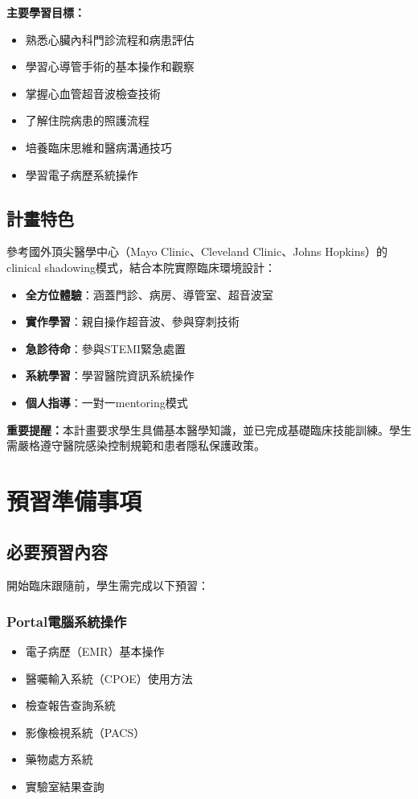 \documentclass[12pt,a4paper]{article}
\begin{document}
\textbf{主要學習目標：}
\begin{itemize}[nosep]
    \item 熟悉心臟內科門診流程和病患評估
    \item 學習心導管手術的基本操作和觀察
    \item 掌握心血管超音波檢查技術
    \item 了解住院病患的照護流程
    \item 培養臨床思維和醫病溝通技巧
    \item 學習電子病歷系統操作
\end{itemize}

\subsection{計畫特色}
參考國外頂尖醫學中心（Mayo Clinic、Cleveland Clinic、Johns Hopkins）的clinical shadowing模式，結合本院實際臨床環境設計：

\begin{itemize}[nosep]
    \item \textbf{全方位體驗}：涵蓋門診、病房、導管室、超音波室
    \item \textbf{實作學習}：親自操作超音波、參與穿刺技術
    \item \textbf{急診待命}：參與STEMI緊急處置
    \item \textbf{系統學習}：學習醫院資訊系統操作
    \item \textbf{個人指導}：一對一mentoring模式
\end{itemize}

\begin{importantbox}
\textbf{重要提醒：}本計畫要求學生具備基本醫學知識，並已完成基礎臨床技能訓練。學生需嚴格遵守醫院感染控制規範和患者隱私保護政策。
\end{importantbox}

\section{預習準備事項}

\subsection{必要預習內容}
開始臨床跟隨前，學生需完成以下預習：

\subsubsection{Portal電腦系統操作}
\begin{itemize}[nosep]
    \item 電子病歷（EMR）基本操作
    \item 醫囑輸入系統（CPOE）使用方法
    \item 檢查報告查詢系統
    \item 影像檢視系統（PACS）
    \item 藥物處方系統
    \item 實驗室結果查詢
\end{itemize}
\end{document}
